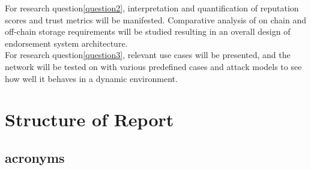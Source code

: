 For research question\ref{question2}, interpretation and quantification of reputation
scores and trust metrics will be manifested. Comparative analysis of on chain
and off-chain storage requirements will be studied resulting in an overall
design of endorsement system architecture. \\

For research question\ref{question3}, relevant use cases will be presented, and the
network will be tested on with various predefined cases and attack models to
see how well it behaves in a dynamic environment. \\

\section{Structure of Report}
\subsection{acronyms}


